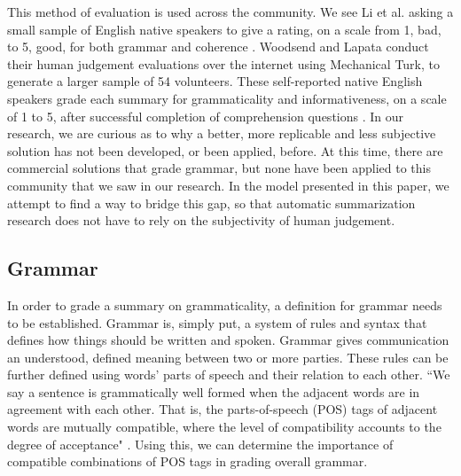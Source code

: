 \documentclass[11pt,a4paper]{article}
\begin{document}
\begin{multicols}{2}
This method of evaluation is used across the community. We see Li et al. asking a small sample of English native speakers to give a rating, on a scale from 1, bad, to 5, good, for both grammar and coherence \cite{li2014}. Woodsend and Lapata conduct their human judgement evaluations over the internet using Mechanical Turk, to generate a larger sample of 54 volunteers. These self-reported native English speakers grade each summary for grammaticality and informativeness, on a scale of 1 to 5, after successful completion of comprehension questions \cite{woodsend2012}. In our research, we are curious as to why a better, more replicable and less subjective solution has not been developed, or been applied, before. At this time, there are commercial solutions that grade grammar, but none have been applied to this community that we saw in our research. In the model presented in this paper, we attempt to find a way to bridge this gap, so that automatic summarization research does not have to rely on the subjectivity of human judgement.


\subsection{Grammar}
In order to grade a summary on grammaticality, a definition for grammar needs to be established. Grammar is, simply put, a system of rules and syntax that defines how things should be written and spoken. Grammar gives communication an understood, defined meaning between two or more parties. These rules can be further defined using words' parts of speech and their relation to each other. ``We say a sentence is grammatically well formed when the adjacent words are in agreement with each other. That is, the parts-of-speech (POS) tags of adjacent words are mutually compatible, where the level of compatibility accounts to the degree of acceptance" \cite{Vadlapudi2010}. Using this, we can determine the importance of compatible combinations of POS tags in grading overall grammar.



\end{multicols}
\end{document}
